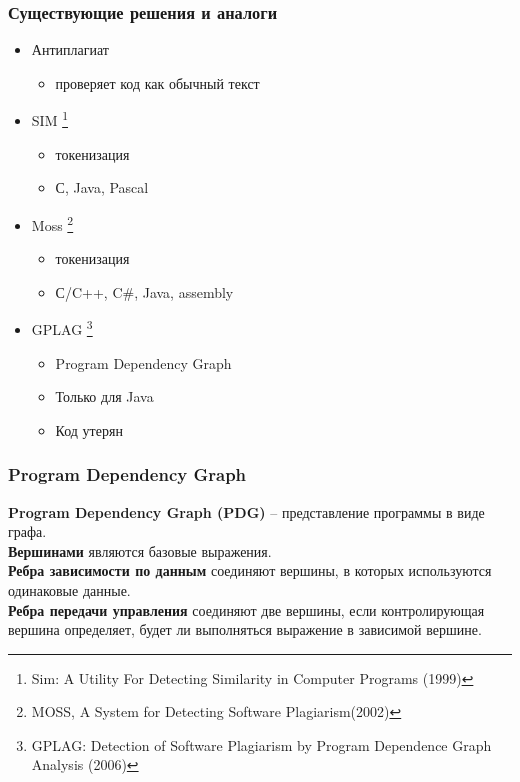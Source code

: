 \documentclass[10pt]{beamer}
\begin{document}
\begin{frame}[fragile]\frametitle{Существующие решения и аналоги}
	\begin{itemize}
		\item Антиплагиат
		\begin{itemize}
			\item проверяет код как обычный текст
		\end{itemize}
		\item SIM \footnote[frame]{Sim: A Utility For Detecting Similarity in Computer Programs (1999)}
		\begin{itemize}
			\item токенизация
			\item С, Java, Pascal
		\end{itemize}
	    \item Moss \footnote[frame]{MOSS, A System for Detecting Software Plagiarism(2002)}
	    \begin{itemize}
	    	\item токенизация
	    	\item С/C++, C#, Java, assembly
	    \end{itemize}
		\item GPLAG \footnote[frame]{GPLAG: Detection of Software Plagiarism by Program Dependence Graph Analysis (2006)}
		\begin{itemize}
			\item Program Dependency Graph
			\item Только для Java
			\item Код утерян
		\end{itemize}
	\end{itemize}
\end{frame}

\begin{frame}\frametitle{Program Dependency Graph}
	\begin{definition}
		\textbf{Program Dependency Graph (PDG)} -- представление программы в виде графа. \\
		\textbf{Вершинами} являются базовые выражения. \\
		\textbf{Ребра зависимости по данным} соединяют вершины, в которых используются одинаковые данные. \\
		\textbf{Ребра передачи управления} соединяют две вершины, если контролирующая вершина определяет, будет ли выполняться выражение в зависимой вершине.
	\end{definition}
\end{frame}
\end{document}
